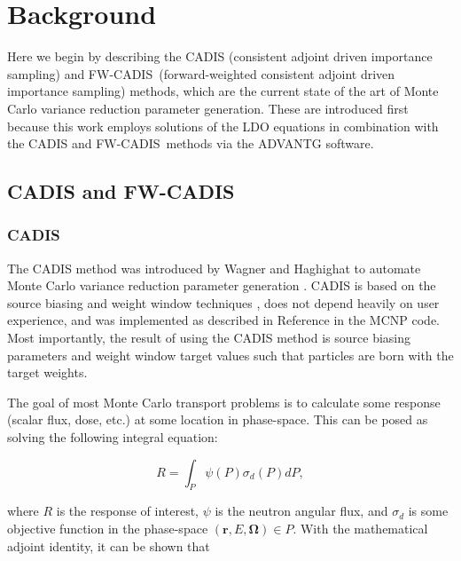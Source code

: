 \documentclass{article} %
\newcommand{\bo}{\mathbf\Omega}
\newcommand{\vecr}{\textbf{r}}
\newcommand{\fwc}{\mbox{FW-CADIS}}
\begin{document}
\section{Background}
\label{sec:background}

Here we begin by describing the CADIS (consistent adjoint driven importance 
sampling) and \fwc\ (forward-weighted consistent adjoint driven importance
sampling) methods, which are the current state
of the art of Monte Carlo variance reduction parameter generation. These are 
introduced first because this work 
employs solutions of the LDO equations in combination with the CADIS and \fwc\ 
methods via the ADVANTG software.

\subsection{CADIS and \fwc}

\subsubsection{CADIS}

The CADIS method was introduced by Wagner and Haghighat to automate Monte Carlo
variance reduction parameter generation \cite{cadis}. CADIS is based on the
source biasing and weight window techniques , does not depend heavily 
on user experience, and was implemented as described in Reference \cite{cadis}
in the MCNP \cite{mcnp} code. Most importantly, the result of using the CADIS
method is source biasing parameters and weight window target
values such that particles are born with the target weights.

The goal of most Monte Carlo transport problems is to calculate some response
(scalar flux, dose, etc.) at some location in phase-space. This can be posed as
solving the following integral equation:

\begin{equation}
R = \int_P \psi(P)\sigma_d(P)dP,
\label{eq:cadis_r1}
\end{equation}

\noindent where $R$ is the response of interest, $\psi$ is the neutron angular
flux, and $\sigma_d$ is some objective function in the phase-space
$(\vecr, E, \bo) \in P$. With the mathematical adjoint identity, it can be
shown that
\end{document}
